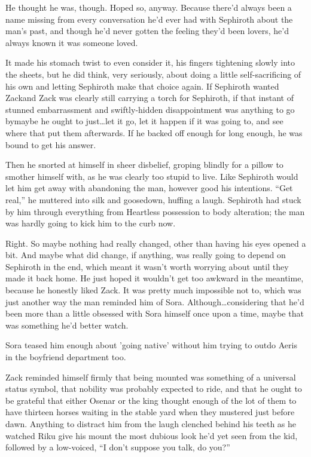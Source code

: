 He thought he was, though. Hoped so, anyway. Because there'd always been a name missing from every conversation he'd ever had with Sephiroth about the man's past, and though he'd never gotten the feeling they'd been lovers, he'd always known it was someone loved.

It made his stomach twist to even consider it, his fingers tightening slowly into the sheets, but he did think, very seriously, about doing a little self-sacrificing of his own and letting Sephiroth make that choice again. If Sephiroth wanted Zack\textemdash and Zack was clearly still carrying a torch for Sephiroth, if that instant of stunned embarrassment and swiftly-hidden disappointment was anything to go by\textemdash maybe he ought to just\ldots let it go, let it happen if it was going to, and see where that put them afterwards. If he backed off enough for long enough, he was bound to get his answer.

Then he snorted at himself in sheer disbelief, groping blindly for a pillow to smother himself with, as he was clearly too stupid to live. Like Sephiroth would let him get away with abandoning the man, however good his intentions. ``Get real,'' he muttered into silk and goosedown, huffing a laugh. Sephiroth had stuck by him through everything from Heartless possession to body alteration; the man was hardly going to kick him to the curb now.

Right. So maybe nothing had really changed, other than having his eyes opened a bit. And maybe what did change, if anything, was really going to depend on Sephiroth in the end, which meant it wasn't worth worrying about until they made it back home. He just hoped it wouldn't get too awkward in the meantime, because he honestly liked Zack. It was pretty much impossible not to, which was just another way the man reminded him of Sora. Although\ldots considering that he'd been more than a little obsessed with Sora himself once upon a time, maybe that was something he'd better watch.

Sora teased him enough about 'going native' without him trying to outdo Aeris in the boyfriend department too.


\scenechange


Zack reminded himself firmly that being mounted was something of a universal status symbol, that nobility was probably expected to ride, and that he ought to be grateful that either Osenar or the king thought enough of the lot of them to have thirteen horses waiting in the stable yard when they mustered just before dawn. Anything to distract him from the laugh clenched behind his teeth as he watched Riku give his mount the most dubious look he'd yet seen from the kid, followed by a low-voiced, ``I don't suppose you talk, do you?''

